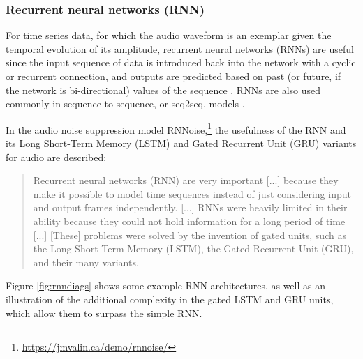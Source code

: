 \documentclass[report.tex]{subfiles}
\begin{document}
\subsubsection{Recurrent neural networks (RNN)}
\label{sec:rnn}

For time series data, for which the audio waveform is an exemplar given the temporal evolution of its amplitude, recurrent neural networks (RNNs) are useful since the input sequence of data is introduced back into the network with a cyclic or recurrent connection, and outputs are predicted based on past (or future, if the network is bi-directional) values of the sequence \parencite{rnns}. RNNs are also used commonly in sequence-to-sequence, or seq2seq, models \parencite{seq2seqs}.

In the audio noise suppression model RNNoise,\footnote{\url{https://jmvalin.ca/demo/rnnoise/}} the usefulness of the RNN and its Long Short-Term Memory (LSTM) \parencite{lstm1} and Gated Recurrent Unit (GRU) \parencite{gru1} variants for audio are described:

\begin{quote}
	Recurrent neural networks (RNN) are very important [...] because they make it possible to model time sequences instead of just considering input and output frames independently. [...] RNNs were heavily limited in their ability because they could not hold information for a long period of time [...] [These] problems were solved by the invention of gated units, such as the Long Short-Term Memory (LSTM), the Gated Recurrent Unit (GRU), and their many variants.
\end{quote}

Figure \ref{fig:rnndiags} shows some example RNN architectures, as well as an illustration of the additional complexity in the gated LSTM and GRU units, which allow them to surpass the simple RNN.
\end{document}
